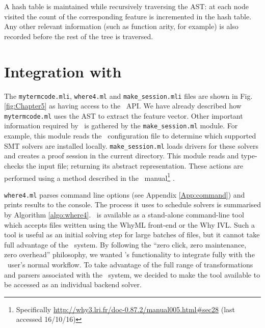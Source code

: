 A hash table is maintained while recursively traversing the AST: at each node visited the count of the corresponding feature is incremented in the hash table. 
Any other relevant information (such as function arity, for example) is also recorded before the rest of the tree is traversed. 

\section{Integration with \why}
\label{sec:why3-integration}

The \texttt{mytermcode.mli}, \texttt{where4.ml} and \texttt{make\_session.mli} files are shown in Fig. \ref{fig:Chapter5} as having access to the \why~API. 
We have already described how \texttt{mytermcode.ml} uses the AST to extract the feature vector.
Other important information required by \why~is gathered by the \texttt{make\_session.ml} module.
For example, this module reads the \why~configuration file to determine which supported SMT solvers are installed locally.
\texttt{make\_session.ml} loads drivers for these solvers and creates a proof session in the current directory. This module reads and type-checks the input file; returning its abstract representation.
These actions are performed using a method described in the \why~manual\footnote{Specifically \url{http://why3.lri.fr/doc-0.87.2/manual005.html\#sec28} (last accessed 16/10/16)} \cite{why:manual}.

\texttt{where4.ml} parses command line options (see Appendix \ref{App:command}) and prints results to the console.
The process it uses to schedule solvers is summarised by Algorithm \ref{algo:where4}.
\where~is available as a stand-alone command-line tool which accepts files written using the WhyML front-end or the Why IVL.
Such a tool is useful as an initial solving step for large batches of files, but it cannot take full advantage of the \why~system.
By following the ``zero click, zero maintenance, zero overhead'' philosophy, we wanted \where's functionality to integrate fully with the \why~user's normal workflow.
To take advantage of the full range of transformations and parsers associated with the \why~system, we decided to make the tool available to be accessed as an individual backend solver.
   
